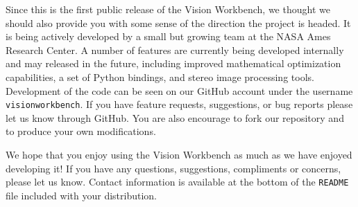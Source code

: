 Since this is the first public release of the Vision Workbench, we
thought we should also provide you with some sense of the direction
the project is headed.  It is being actively developed by a small but
growing team at the NASA Ames Research Center.  A number of features
are currently being developed internally and may released in the
future, including improved mathematical optimization capabilities, a
set of Python bindings, and stereo image processing tools. Development
of the code can be seen on our GitHub account under the username
\verb#visionworkbench#. If you have feature requests, suggestions, or
bug reports please let us know through GitHub. You are also encourage
to fork our repository and to produce your own modifications.

We hope that you enjoy using the Vision Workbench as much as we have
enjoyed developing it!  If you have any questions, suggestions,
compliments or concerns, please let us know.  Contact information is
available at the bottom of the \verb#README# file included with your
distribution.
